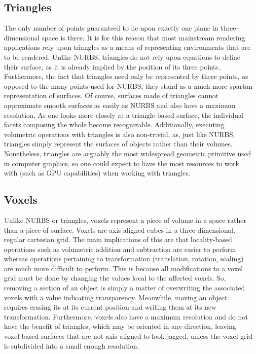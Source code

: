 \documentclass[onecolumn, draftclsnofoot,10pt, compsoc]{IEEEtran}
\begin{document}
\subsection{Triangles}
The only number of points guaranteed to lie upon exactly one plane in three-dimensional space is three. It is for this reason that most mainstream rendering applications rely upon triangles as a means of representing environments that are to be rendered. Unlike NURBS, triangles do not rely upon equations to define their surface, as it is already implied by the position of its three points. Furthermore, the fact that triangles need only be represented by three points, as opposed to the many points used for NURBS, they stand as a much more spartan representation of surfaces. Of course, surfaces made of triangles cannot approximate smooth surfaces as easily as NURBS and also have a maximum resolution. As one looks more closely at a triangle-based surface, the individual facets composing the whole become recognizable. Additionally, executing volumetric operations with triangles is also non-trivial, as, just like NURBS, triangles simply represent the surfaces of objects rather than their volumes. Nonetheless, triangles are arguably the most widespread geometric primitive used in computer graphics, so one could expect to have the most resources to work with (such as GPU capabilities) when working with triangles.



\subsection{Voxels}
Unlike NURBS or triangles, voxels represent a piece of volume in a space rather than a piece of surface. Voxels are axis-aligned cubes in a three-dimensional, regular cartesian grid. The main implications of this are that locality-based operations such as volumetric addition and subtraction are easier to perform whereas operations pertaining to transformation (translation, rotation, scaling) are much more difficult to perform. This is because all modifications to a voxel grid must be done by changing the values local to the affected voxels. So, removing a section of an object is simply a matter of overwriting the associated voxels with a value indicating transparency. Meanwhile, moving an object requires erasing its at its current position and writing them at its new transformation. Furthermore, voxels also have a maximum resolution and do not have the benefit of triangles, which may be oriented in any direction, leaving voxel-based surfaces that are not axis aligned to look jagged, unless the voxel grid is subdivided into a small enough resolution.
\end{document}
